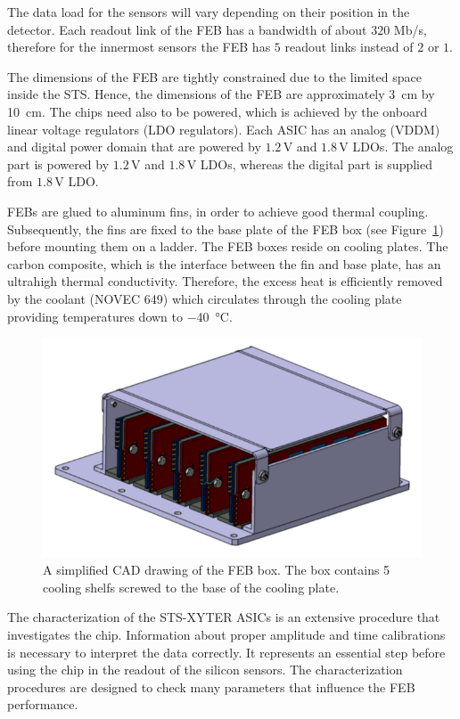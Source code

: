 The data load for the sensors will vary depending on their position in the detector. Each readout link of the \gls{FEB} has a bandwidth of about $320$ Mb/s, therefore for the innermost sensors the \gls{FEB} has $5$ readout links instead of $2$ or $1$. 

The dimensions of the \gls{FEB} are tightly constrained due to the limited space inside the \gls{STS}. Hence, the dimensions of the \gls{FEB} are approximately \SI{3}{\centi\metre} by \SI{10}{\centi\metre}. The chips need also to be powered, which is achieved by the onboard linear voltage regulators (\gls{LDO} regulators). Each \gls{ASIC} has an analog (VDDM) and digital power domain that are powered by $1.2$\,V and $1.8$\,V \glspl{LDO}. The analog part is powered by $1.2$\,V and $1.8$\,V \glspl{LDO}, whereas the digital part is supplied from $1.8$\,V \gls{LDO}.

\glspl{FEB} are glued to aluminum fins, in order to achieve good thermal coupling. Subsequently, the fins are fixed to the base plate of the \gls{FEB} box (see Figure~\ref{feb_box}) before mounting them on a ladder. The \gls{FEB} boxes reside on cooling plates. The carbon composite, which is the interface between the fin and base plate, has an ultrahigh thermal conductivity. Therefore, the excess heat is efficiently removed by the coolant (NOVEC 649) which circulates through the cooling plate providing temperatures down to \SI{-40}{\celsius}. 

\begin{figure}[!h]
\centering
\includegraphics[width=0.55\columnwidth]{Chapter2/images/feb_box_1.png}
\caption{A simplified CAD drawing of the \gls{FEB} box. The box contains 5 cooling shelfs screwed to the base of the cooling plate.}
\label{feb_box}
\end{figure}

\newpage
The characterization of the STS-XYTER ASICs is an extensive procedure that investigates the chip. Information about proper amplitude and time calibrations is necessary to interpret the data correctly. It represents an essential step before using the chip in the readout of the silicon sensors. The characterization procedures are designed to check many parameters that influence the \gls{FEB} performance. 


